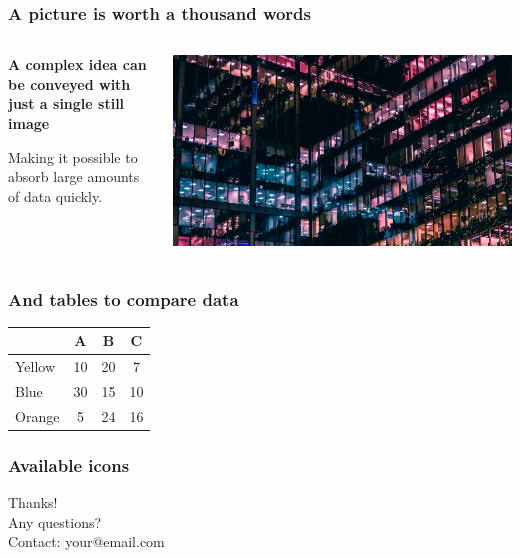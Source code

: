\documentclass[aspectratio=169]{beamer}
\begin{document}
\begin{frame}
\frametitle{A picture is worth a thousand words}
\begin{columns}[T]
    \begin{column}{0.4\textwidth}
        \textbf{A complex idea can be conveyed with just a single still image}
        \vspace{1em}
        
        Making it possible to absorb large amounts of data quickly.
    \end{column}
    \begin{column}{0.6\textwidth}
        \includegraphics[width=\textwidth]{images/city.jpg}
    \end{column}
\end{columns}
\end{frame}

\begin{frame}
\frametitle{And tables to compare data}
\begin{center}
\begin{tabular}{lccc}
\toprule
& A & B & C \\
\midrule
Yellow & 10 & 20 & 7 \\
Blue & 30 & 15 & 10 \\
Orange & 5 & 24 & 16 \\
\bottomrule
\end{tabular}
\end{center}
\end{frame}

\begin{frame}
\frametitle{Available icons}
\begin{center}
\end{center}
\end{frame}



\begin{frame}
\begin{center}
\Huge Thanks!\\[1em]
\large Any questions?\\[1em]
\normalsize
Contact: your@email.com
\end{center}
\end{frame}
\end{document}
